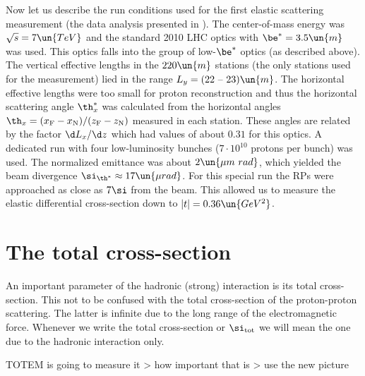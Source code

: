 
Now let us describe the run conditions used for the first elastic scattering measurement (the data analysis presented in ). The center-of-mass energy was $\sqrt s = 7\un{TeV}$ and the standard 2010 LHC optics with $\be^* = 3.5\un{m}$ was used. This optics falls into the group of low-$\be^*$ optics (as described above). The vertical effective lengths in the $220\un{m}$ stations (the only stations used for the measurement) lied in the range $L_y = (22 \hbox{ -- } 23)\un{m}$. The horizontal effective lengths were too small for proton reconstruction and thus the horizontal scattering angle $\th_x^*$ was calculated from the horizontal angles $\th_x = (x_{\rm F} - x_{\rm N})/(z_{\rm F} - z_{\rm N})$ measured in each station. These angles are related by the factor $\d L_{x}/\d z$ which had values of about $0.31$ for this optics. A dedicated run with four low-luminosity bunches ($7\cdot10^{10}$ protons per bunch) was used. The normalized emittance was about $2\un{\mu m\ rad}$, which yielded the beam divergence $\si_{\th^*} \approx 17\un{\mu rad}$. For this special run the RPs were approached as close as $7\si$ from the beam. This allowed us to measure the elastic differential cross-section down to $|t| = 0.36\un{GeV^2}$.



\section[ttm tcs]{The total cross-section}

An important parameter of the hadronic (strong) interaction is its total cross-section. This not to be confused with the total cross-section of the proton-proton scattering. The latter is infinite due to the long range of the electromagnetic force. Whenever we write the total cross-section or $\si_{\rm tot}$ we will mean the one due to the hadronic interaction only.

\> TOTEM is going to measure it
\>> how important that is
\>> use the new picture



